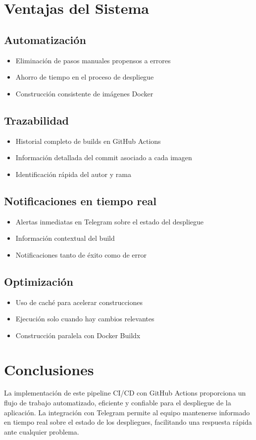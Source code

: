 \documentclass{article}
\begin{document}
\section{Ventajas del Sistema}

\subsection{Automatización}
\begin{itemize}
    \item Eliminación de pasos manuales propensos a errores
    \item Ahorro de tiempo en el proceso de despliegue
    \item Construcción consistente de imágenes Docker
\end{itemize}

\subsection{Trazabilidad}
\begin{itemize}
    \item Historial completo de builds en GitHub Actions
    \item Información detallada del commit asociado a cada imagen
    \item Identificación rápida del autor y rama
\end{itemize}

\subsection{Notificaciones en tiempo real}
\begin{itemize}
    \item Alertas inmediatas en Telegram sobre el estado del despliegue
    \item Información contextual del build
    \item Notificaciones tanto de éxito como de error
\end{itemize}

\subsection{Optimización}
\begin{itemize}
    \item Uso de caché para acelerar construcciones
    \item Ejecución solo cuando hay cambios relevantes
    \item Construcción paralela con Docker Buildx
\end{itemize}

\section{Conclusiones}
La implementación de este pipeline CI/CD con GitHub Actions proporciona un flujo de trabajo automatizado, eficiente y confiable para el despliegue de la aplicación. La integración con Telegram permite al equipo mantenerse informado en tiempo real sobre el estado de los despliegues, facilitando una respuesta rápida ante cualquier problema.
\end{document}
